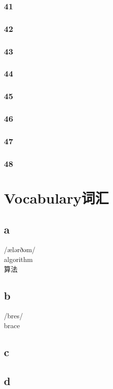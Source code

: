 \documentclass[12pt,twiside,a4paper]{ctexbook}
\numberwithin{chapter}{part}
\begin{document}
\subsection{41}
\subsection{42}
\subsection{43}
\subsection{44}
\subsection{45}
\subsection{46}
\subsection{47}
\subsection{48}
\chapter{Vocabulary词汇}
\section{a}
/\textprimstress ælərðəm/\\
algorithm\\
算法

\section{b}
/bres/\\
brace\\

\section{c}
\section{d}
\end{document}
